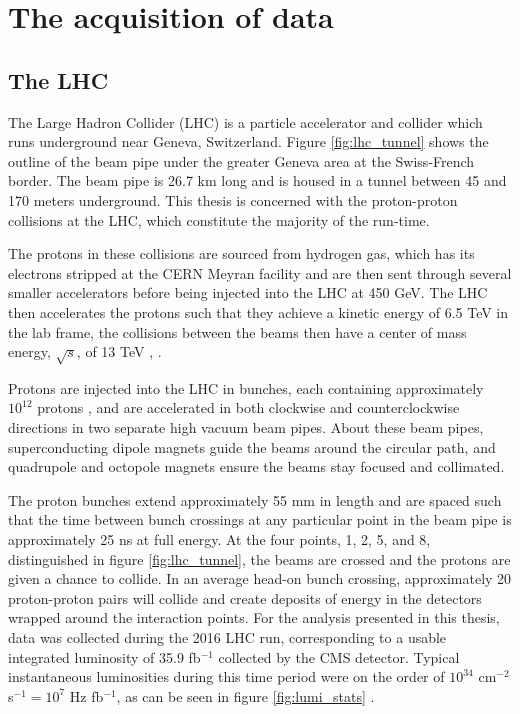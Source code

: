 \chapter{The acquisition of data}

\section{The LHC}
  The Large Hadron Collider (LHC) is a particle accelerator and collider which runs underground near Geneva, Switzerland. Figure \ref{fig:lhc_tunnel} shows the outline of the beam pipe under the greater Geneva area at the Swiss-French border. The beam pipe is 26.7 km long and is housed in a tunnel between 45 and 170 meters underground. This thesis is concerned with the proton-proton collisions at the LHC, which constitute the majority of the run-time. 

  The protons in these collisions are sourced from hydrogen gas, which has its electrons stripped at the CERN Meyran facility and are then sent through several smaller accelerators before being injected into the LHC at 450 GeV. The LHC then accelerates the protons such that they achieve a kinetic energy of 6.5 TeV in the lab frame, the collisions between the beams then have a center of mass energy, $\sqrt{s}$, of 13 TeV \cite{LHC_JINST}, \cite{LHC_TDR}. 

  Protons are injected into the LHC in bunches, each containing approximately $10^{12}$ protons \cite{Lumi_unc}, and are accelerated in both clockwise and counterclockwise directions in two separate high vacuum beam pipes. About these beam pipes, superconducting dipole magnets guide the beams around the circular path, and quadrupole and octopole magnets ensure the beams stay focused and collimated.

  The proton bunches extend approximately 55 mm in length and are spaced such that the time between bunch crossings at any particular point in the beam pipe is approximately 25 ns at full energy. At the four points, 1, 2, 5, and 8, distinguished in figure \ref{fig:lhc_tunnel}, the beams are crossed and the protons are given a chance to collide. In an average head-on bunch crossing, approximately 20 proton-proton pairs will collide and create deposits of energy in the detectors wrapped around the interaction points. For the analysis presented in this thesis, data was collected during the 2016 LHC run, corresponding to a usable integrated luminosity of 35.9 fb$^{-1}$ collected by the CMS detector. Typical instantaneous luminosities during this time period were on the order of $10^{34}$ cm$^{-2}$ s$^{-1} = 10^7$ Hz fb$^{-1}$, as can be seen in figure \ref{fig:lumi_stats} \cite{lumi_twiki}.

